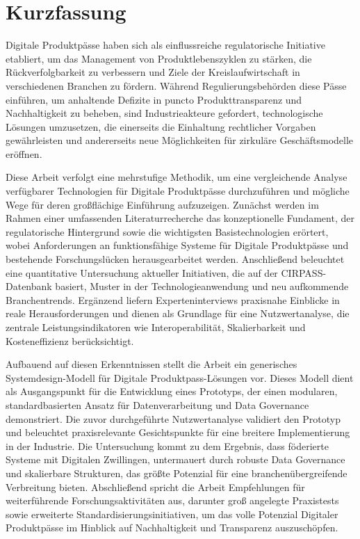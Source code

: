 \chapter*{Kurzfassung}
\thispagestyle{empty}

Digitale Produktpässe haben sich als einflussreiche regulatorische Initiative etabliert, um das Management von Produktlebenszyklen zu stärken, die Rückverfolgbarkeit zu verbessern und Ziele der Kreislaufwirtschaft in verschiedenen Branchen zu fördern. Während Regulierungsbehörden diese Pässe einführen, um anhaltende Defizite in puncto Produkttransparenz und Nachhaltigkeit zu beheben, sind Industrieakteure gefordert, technologische Lösungen umzusetzen, die einerseits die Einhaltung rechtlicher Vorgaben gewährleisten und andererseits neue Möglichkeiten für zirkuläre Geschäftsmodelle eröffnen.

Diese Arbeit verfolgt eine mehrstufige Methodik, um eine vergleichende Analyse verfügbarer Technologien für Digitale Produktpässe durchzuführen und mögliche Wege für deren großflächige Einführung aufzuzeigen. Zunächst werden im Rahmen einer umfassenden Literaturrecherche das konzeptionelle Fundament, der regulatorische Hintergrund sowie die wichtigsten Basistechnologien erörtert, wobei Anforderungen an funktionsfähige Systeme für Digitale Produktpässe und bestehende Forschungslücken herausgearbeitet werden. Anschließend beleuchtet eine quantitative Untersuchung aktueller Initiativen, die auf der CIRPASS-Datenbank basiert, Muster in der Technologieanwendung und neu aufkommende Branchentrends. Ergänzend liefern Experteninterviews praxisnahe Einblicke in reale Herausforderungen und dienen als Grundlage für eine Nutzwertanalyse, die zentrale Leistungsindikatoren wie Interoperabilität, Skalierbarkeit und Kosteneffizienz berücksichtigt.

Aufbauend auf diesen Erkenntnissen stellt die Arbeit ein generisches Systemdesign-Modell für Digitale Produktpass-Lösungen vor. Dieses Modell dient als Ausgangspunkt für die Entwicklung eines Prototyps, der einen modularen, standardbasierten Ansatz für Datenverarbeitung und Data Governance demonstriert. Die zuvor durchgeführte Nutzwertanalyse validiert den Prototyp und beleuchtet praxisrelevante Gesichtspunkte für eine breitere Implementierung in der Industrie. Die Untersuchung kommt zu dem Ergebnis, dass föderierte Systeme mit Digitalen Zwillingen, untermauert durch robuste Data Governance und skalierbare Strukturen, das größte Potenzial für eine branchenübergreifende Verbreitung bieten. Abschließend spricht die Arbeit Empfehlungen für weiterführende Forschungsaktivitäten aus, darunter groß angelegte Praxistests sowie erweiterte Standardisierungsinitiativen, um das volle Potenzial Digitaler Produktpässe im Hinblick auf Nachhaltigkeit und Transparenz auszuschöpfen.

